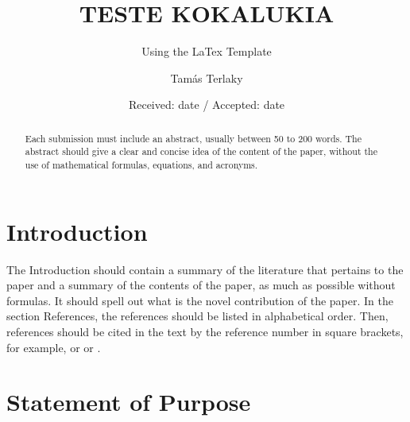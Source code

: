 \documentclass[smallextended,referee,envcountsect,]{svjour3}
\begin{document}
\title{TESTE KOKALUKIA}

\subtitle{Using  the  LaTex Template}

\author{Tam\'as Terlaky}


\date{Received: date / Accepted: date}

\maketitle

\begin{abstract}
Each submission must include an abstract, usually between 50 to 200 words. The abstract should give a clear and concise idea of the  content of the paper,  without the use of mathematical formulas, equations, and acronyms.
\end{abstract}


\section{Introduction}

The Introduction should contain a summary of the literature that pertains to the paper and a summary of the contents of the paper, as much as possible without formulas. It should spell out what is the novel contribution of the paper.  In the section References, the references should be listed in alphabetical order. Then, references should be cited in the text by the reference number in square brackets, for example, \cite{Huang} or \cite{Huang,Miele} or 
\cite{Huang,Miele,Nocedal,Ralston,Yang}.

\section{Statement of Purpose}
\end{document}
